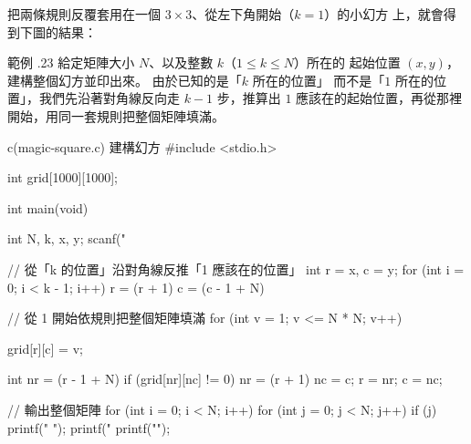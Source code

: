 把兩條規則反覆套用在一個 $3 \times 3$、從左下角開始（$k=1$）的小幻方
上，就會得到下圖的結果：

\begin{center}
\label{fig:ch06-magic-square-result}
\end{center}

範例 \thechapter.23 給定矩陣大小 $N$、以及整數 $k$（$1 \le k \le N$）所在的
起始位置 $(x, y)$，建構整個幻方並印出來。 由於已知的是「$k$ 所在的位置」
而不是「$1$ 所在的位置」，我們先沿著對角線反向走 $k - 1$ 步，推算出
$1$ 應該在的起始位置，再從那裡開始，用同一套規則把整個矩陣填滿。

\begin{example}{c}{(magic-square.c) 建構幻方}
#include <stdio.h>

int grid[1000][1000];

int main(void) {
    int N, k, x, y;
    scanf("%

    // 從「k 的位置」沿對角線反推「1 應該在的位置」
    int r = x, c = y;
    for (int i = 0; i < k - 1; i++) {
        r = (r + 1) %
        c = (c - 1 + N) %
    }

    // 從 1 開始依規則把整個矩陣填滿
    for (int v = 1; v <= N * N; v++) {
        grid[r][c] = v;

        int nr = (r - 1 + N) %
        if (grid[nr][nc] != 0) {
            nr = (r + 1) %
            nc = c;
        }
        r = nr;
        c = nc;
    }

    // 輸出整個矩陣
    for (int i = 0; i < N; i++) {
        for (int j = 0; j < N; j++) {
            if (j) {
                printf(" ");
            }
            printf("%
        }
        printf("\n");
    }
}
\end{example}


